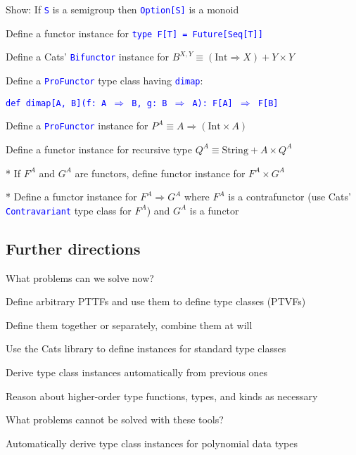 Show: If \texttt{\textcolor{blue}{\footnotesize{}S}} is a semigroup
then \texttt{\textcolor{blue}{\footnotesize{}Option{[}S{]}}} is a
monoid

Define a functor instance for \texttt{\textcolor{blue}{\footnotesize{}type
F{[}T{]} = Future{[}Seq{[}T{]}{]}}}{\footnotesize\par}

Define a Cats' \texttt{\textcolor{blue}{\footnotesize{}Bifunctor}}
instance for $B^{X,Y}\equiv\left(\text{Int}\Rightarrow X\right)+Y\times Y$

Define a \texttt{\textcolor{blue}{\footnotesize{}ProFunctor}} type
class having \texttt{\textcolor{blue}{\footnotesize{}dimap}}:

\texttt{\textcolor{blue}{\footnotesize{}def dimap{[}A, B{]}(f: A $\Rightarrow$
B, g: B $\Rightarrow$ A): F{[}A{]} $\Rightarrow$ F{[}B{]}}}{\footnotesize\par}

Define a \texttt{\textcolor{blue}{\footnotesize{}ProFunctor}} instance
for $P^{A}\equiv A\Rightarrow\left(\text{Int}\times A\right)$

Define a functor instance for recursive type $Q^{A}\equiv\text{String}+A\times Q^{A}$

{*} If $F^{A}$ and $G^{A}$ are functors, define functor instance
for $F^{A}\times G^{A}$ 

{*} Define a functor instance for $F^{A}\Rightarrow G^{A}$ where
$F^{A}$ is a contrafunctor (use Cats' \texttt{\textcolor{blue}{\footnotesize{}Contravariant}}
type class for $F^{A}$) and $G^{A}$ is a functor


\subsection{Further directions}

What problems can we solve now?

Define arbitrary PTTFs and use them to define type classes (PTVFs) 

Define them together or separately, combine them at will

Use the Cats library to define instances for standard type classes

Derive type class instances automatically from previous ones

Reason about higher-order type functions, types, and kinds as necessary

What problems cannot be solved with these tools?

Automatically derive type class instances for polynomial data types

